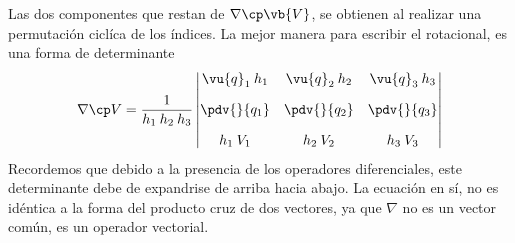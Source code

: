 Las dos componentes que restan de $\nabla \cp \vb{V}$, se obtienen al realizar una permutación ciclíca de los índices. La mejor manera para escribir el rotacional, es una forma de determinante
\begin{equation}
\nabla \cp V = \dfrac{1}{h_{1} \: h_{2} \: h_{3}} \begin{vmatrix}
\vu{q}_{1} \: h_{1} & \vu{q}_{2} \: h_{2} & \vu{q}_{3} \: h_{3} \\[1em]
\displaystyle \pdv{}{q_{1}} & \displaystyle \pdv{}{q_{2}} & \displaystyle \pdv{}{q_{3}} \\[1em]
h_{1} \: V_{1} & h_{2} \: V_{2} & h_{3} \: V_{3}
\end{vmatrix}
\end{equation}
Recordemos que debido a la presencia de los operadores diferenciales, este determinante debe de expandrise de arriba hacia abajo. La ecuación en sí, no es idéntica a la forma del producto cruz de dos vectores, ya que $\nabla$ no es un vector común, es un operador vectorial.
